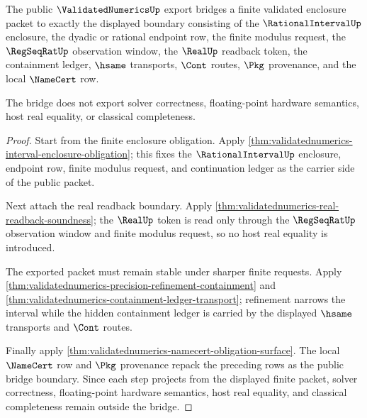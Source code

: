 \begin{theorem}
\label{thm:validatednumerics-exported-enclosure-bridge}
The public $\ValidatedNumericsUp$ export bridges a finite validated enclosure
packet to exactly the displayed boundary consisting of the
$\RationalIntervalUp$ enclosure, the dyadic or rational endpoint row, the
finite modulus request, the $\RegSeqRatUp$ observation window, the $\RealUp$
readback token, the containment ledger, $\hsame$ transports, $\Cont$ routes,
$\Pkg$ provenance, and the local $\NameCert$ row.

The bridge does not export solver correctness, floating-point hardware
semantics, host real equality, or classical completeness.
\end{theorem}
\begin{proof}
Start from the finite enclosure obligation. Apply
\autoref{thm:validatednumerics-interval-enclosure-obligation}; this fixes the
$\RationalIntervalUp$ enclosure, endpoint row, finite modulus request, and
continuation ledger as the carrier side of the public packet.

Next attach the real readback boundary. Apply
\autoref{thm:validatednumerics-real-readback-soundness}; the $\RealUp$ token is
read only through the $\RegSeqRatUp$ observation window and finite modulus
request, so no host real equality is introduced.

The exported packet must remain stable under sharper finite requests. Apply
\autoref{thm:validatednumerics-precision-refinement-containment} and
\autoref{thm:validatednumerics-containment-ledger-transport}; refinement
narrows the interval while the hidden containment ledger is carried by the
displayed $\hsame$ transports and $\Cont$ routes.

Finally apply \autoref{thm:validatednumerics-namecert-obligation-surface}. The
local $\NameCert$ row and $\Pkg$ provenance repack the preceding rows as the
public bridge boundary. Since each step projects from the displayed finite
packet, solver correctness, floating-point hardware semantics, host real
equality, and classical completeness remain outside the bridge.
\end{proof}

